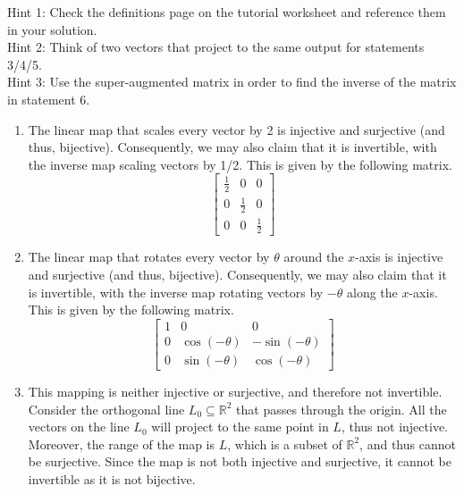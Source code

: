 \begin{SaveQuestion}
    Hint 1: Check the definitions page on the tutorial worksheet and reference them in your solution.\\
    Hint 2: Think of two vectors that project to the same output for statements 3/4/5. \\
    Hint 3: Use the super-augmented matrix in order to find the inverse of the matrix in statement 6.
    \begin{enumerate}
        \item The linear map that scales every vector by 2 is injective and surjective (and thus, bijective). Consequently, we may also claim that it is invertible, with the inverse map scaling vectors by 1/2. This is given by the following matrix.
        $$\begin{bmatrix} \frac{1}{2} & 0 & 0 \\ 0 & \frac{1}{2} &0 \\ 0 & 0 & \frac{1}{2}\end{bmatrix}$$

        \item The linear map that rotates every vector by $\theta$ around the $x$-axis is injective and surjective (and thus, bijective). Consequently, we may also claim that it is invertible, with the inverse map rotating vectors by $-\theta$ along the $x$-axis. This is given by the following matrix.
        $$\begin{bmatrix} 1 & 0 & 0 \\ 0 & \cos(-\theta) &-\sin(-\theta) \\ 0 &\sin(-\theta) & \cos(-\theta)\end{bmatrix}$$

        \item This mapping is neither injective or surjective, and therefore not invertible. Consider the orthogonal line $L_0 \subseteq \mathbb{R}^2$ that passes through the origin. All the vectors on the line $L_0$ will project to the same point in $L$, thus not injective. Moreover, the range of the map is $L$, which is a subset of $\mathbb{R}^2$, and thus cannot be surjective. Since the map is not both injective and surjective, it cannot be invertible as it is not bijective. 


\end{enumerate}
\end{SaveQuestion}
